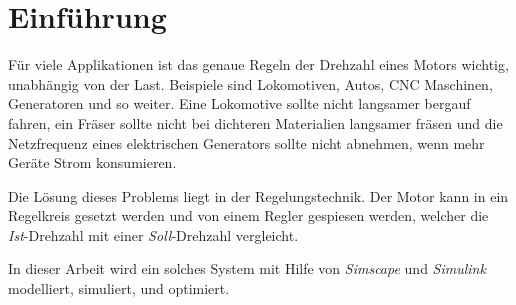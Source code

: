 \section{Einf\"uhrung}

F\"ur viele  Applikationen  ist  das  genaue  Regeln der Drehzahl eines Motors
wichtig,  unabh\"angig  von  der  Last.  Beispiele  sind  Lokomotiven,  Autos,
CNC Maschinen,  Generatoren  und  so  weiter.  Eine  Lokomotive  sollte  nicht
langsamer bergauf fahren, ein Fr\"aser sollte nicht  bei dichteren Materialien
langsamer fr\"asen und die Netzfrequenz eines elektrischen  Generators  sollte
nicht abnehmen, wenn mehr Ger\"ate Strom konsumieren.

Die L\"osung dieses  Problems liegt in der Regelungstechnik. Der Motor kann in
ein  Regelkreis gesetzt werden und von einem Regler gespiesen werden,  welcher
die   \textit{Ist}-Drehzahl  mit  einer   \textit{Soll}-Drehzahl   vergleicht.

In dieser Arbeit wird ein solches System mit Hilfe  von \textit{Simscape}  und
\textit{Simulink} modelliert, simuliert, und optimiert.

